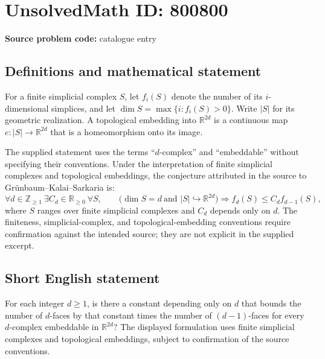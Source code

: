 \documentclass[11pt]{article}
\newcommand{\Z}{\mathbb{Z}}
\newcommand{\R}{\mathbb{R}}
\begin{document}
\section*{UnsolvedMath ID: 800800}
\textbf{Source problem code:} catalogue entry
\subsection{Definitions and mathematical statement}
For a finite simplicial complex \(S\), let \(f_i(S)\) denote the number of its \(i\)-dimensional simplices, and let \(\dim S=\max\{i:f_i(S)>0\}\). Write \(|S|\) for its geometric realization. A topological embedding into \(\R^{2d}\) is a continuous map \(e:|S|\to\R^{2d}\) that is a homeomorphism onto its image.

The supplied statement uses the terms ``\(d\)-complex'' and ``embeddable'' without specifying their conventions. Under the interpretation of finite simplicial complexes and topological embeddings, the conjecture attributed in the source to Gr\"unbaum--Kalai--Sarkaria is:
\[
\forall d\in\Z_{\ge1}\ \exists C_d\in\R_{\ge0}\ \forall S,\qquad
\bigl(\dim S=d\ \text{and } |S|\hookrightarrow\R^{2d}\bigr)
\Longrightarrow f_d(S)\le C_d f_{d-1}(S),
\]
where \(S\) ranges over finite simplicial complexes and \(C_d\) depends only on \(d\). The finiteness, simplicial-complex, and topological-embedding conventions require confirmation against the intended source; they are not explicit in the supplied excerpt.
\subsection{Short English statement}
For each integer \(d\ge1\), is there a constant depending only on \(d\) that bounds the number of \(d\)-faces by that constant times the number of \((d-1)\)-faces for every \(d\)-complex embeddable in \(\R^{2d}\)? The displayed formulation uses finite simplicial complexes and topological embeddings, subject to confirmation of the source conventions.
\end{document}
